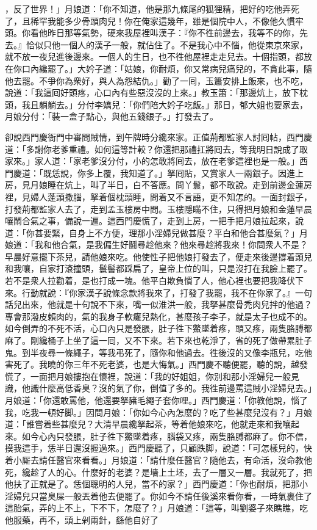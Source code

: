 ，反了世界！」月娘道：「你不知道，他是那九條尾的狐狸精，把好的吃他弄死了，且稀罕我能多少骨頭肉兒！你在俺家這幾年，雖是個院中人，不像他久慣牢頭。你看他昨日那等氣勢，硬來我屋裡叫漢子：『你不徃前邊去，我等不的你，先去。』恰似只他一個人的漢子一般，就佔住了。不是我心中不惱，他從東京來家，就不放一夜兒進後邊來。一個人的生日，也不徃他屋裡走走兒去。十個指頭，都放在你口內纔罷了。」{}大妗子道：「姑娘，你耐煩，你又常病兒痛兒的，不貪此事，隨他去罷。不爭你為衆好，與人為怨結仇。」勸了一囘，玉簫安排上飯來，也不吃，說道：「我這囘好頭疼，心口內有些惡沒沒的上來。」教玉簫：「那邊炕上，放下枕頭，我且躺躺去。」分付李嬌兒：「你們陪大妗子吃飯。」那日，郁大姐也要家去，月娘分付：「裝一盒子點心，與他五錢銀子。」打發去了。

卻說西門慶衙門中審問賊情，到午牌時分纔來家。正值荊都監家人討囘帖，西門慶道：「多謝你老爹重禮。如何這等計較？你還把那禮扛將囘去，等我明日說成了取家來。」家人道：「家老爹沒分付，小的怎敢將囘去，放在老爹這裡也是一般。」西門慶道：「既恁說，你多上覆，我知道了。」拏囘貼，又賞家人一兩銀子。因進上房，見月娘睡在炕上，叫了半日，白不答應。問丫鬟，都不敢說。走到前邊金蓮房裡，見婦人蓬頭撒腦，拏着個枕頭睡，問着又不言語，更不知怎的。一面封銀子，打發荊都監家人去了，走到孟玉樓房中問。玉樓隱瞞不住，只得把月娘和金蓮早晨嚷鬧合氣之事，備說一遍。這西門慶慌了，走到上房，一把手把月娘拉起來，說道：「你甚要緊，自身上不方便，理那小淫婦兒做甚麼？平白和他合甚麼氣？」月娘道：「我和他合氣，是我偏生好鬪尋趁他來？他來尋趁將我來！你問衆人不是？早晨好意擺下茶兒，請他娘來吃。他使性子把他娘打發去了，便走來後邊撐着頭兒和我嚷，自家打滾撞頭，鬟髻都踩扁了，皇帝上位的叫，只是沒打在我臉上罷了。若不是衆人拉勸着，是也打成一塊。他平白欺負慣了人，他心裡也要把我降伏下來。行動就說：『你家漢子說條念款將我來了，打發了我罷，我不在你家了。』一句話兒出來，他就是十句說不下來，嘴一似淮洪一般，我拏甚麼骨禿肉兒拌的他過？專會那潑皮賴肉的，氣的我身子軟癱兒熱化，甚麼孩子李子，就是太子也成不的。如今倒弄的不死不活，心口內只是發脹，肚子徃下鱉墜着疼，頭又疼，兩隻胳膊都麻了。剛纔桶子上坐了這一囘，又不下來。若下來也乾淨了，省的死了做帶累肚子鬼。到半夜尋一條繩子，等我弔死了，隨你和他過去。徃後沒的又像李瓶兒，吃他害死了。{}我曉的你三年不死老婆，也是大悔氣。」西門慶不聽便罷，聽的說，越發慌了，一面把月娘摟抱在懷裡，說道：「我的好姐姐，你別和那小淫婦兒一般見識，他識什麼高低香臭？沒的氣了你，倒值了多的。我徃前邊罵這賊小淫婦兒去。」月娘道：「你還敢罵他，他還要拏豬毛繩子套你哩。」西門慶道：「你教他說，惱了我，吃我一頓好脚。」因問月娘：「你如今心內怎麼的？吃了些甚麼兒沒有？」月娘道：「誰嘗着些甚麼兒？大清早晨纔拏起茶，等着他娘來吃，他就走來和我嚷起來。如今心內只發脹，肚子徃下鱉墜着疼，腦袋又疼，兩隻胳膊都麻了。你不信，摸我這手，恁半日還沒握過來。」西門慶聽了，只顧跌脚，說道：「可怎樣兒的，快着小厮去請任醫官來看看。」月娘道：「請什麼任醫官？隨他去，有命活，沒命教他死，纔趁了人的心。什麼好的老婆？是墻上土坯，去了一層又一層。我就死了，把他扶了正就是了。恁個聰明的人兒，當不的家？」西門慶道：「你也耐煩，把那小淫婦兒只當臭屎一般丟着他去便罷了。你如今不請任後溪來看你看，一時氣裹住了這胎氣，弄的上不上，下不下，怎麼了？」月娘道：「這等，叫劉婆子來瞧瞧，吃他服藥，再不，頭上剁兩針，繇他自好了